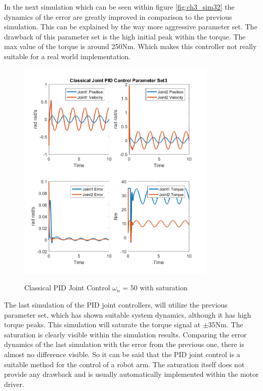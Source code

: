 In the next simulation which can be seen within figure \ref{fig:ch3_sim32} the dynamics of the error are greatly improved in comparison to the previous simulation. This can be explained by the way more aggressive parameter set. The drawback of this parameter set is the high initial peak within the torque. The max value of the torque is around 250Nm. Which makes this controller not really suitable for a real world implementation.
\begin{figure}[h]
	\centering
	\includegraphics[width=0.85\textwidth]{pics/ClassicalJointPIDControlParameterSet3.png}\\
	\caption{Classical PID Joint Control $\omega_n$ = 50 with saturation}
	\label{fig:ch3_sim33}
\end{figure}
The last simulation of the PID joint controllers, will utilize the previous parameter set, which has shown suitable system dynamics, although it has high torque peaks. This simulation will saturate the torque signal at $\pm$35Nm. The saturation is clearly visible within the simulation results. Comparing the error dynamics of the last simulation with the error from the previous one, there is almost no difference visible. So it can be said that the PID joint control is a suitable method for the control of a robot arm. The saturation itself does not provide any drawback and is usually automatically implemented within the motor driver.

